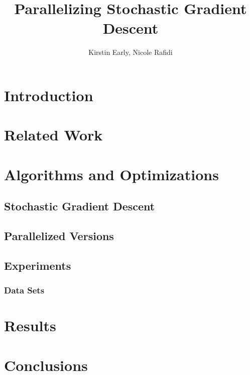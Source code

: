 \documentclass{article}
\title{Parallelizing Stochastic Gradient Descent}
\author{Kirstin Early, \qquad Nicole Rafidi}
\begin{document}
\maketitle
\section{Introduction}
\section{Related Work}
\section{Algorithms and Optimizations}
\subsection{Stochastic Gradient Descent}
\subsection{Parallelized Versions}
\subsection{Experiments}
\subsubsection{Data Sets}
\section{Results}
\section{Conclusions}

%
%
\end{document}
